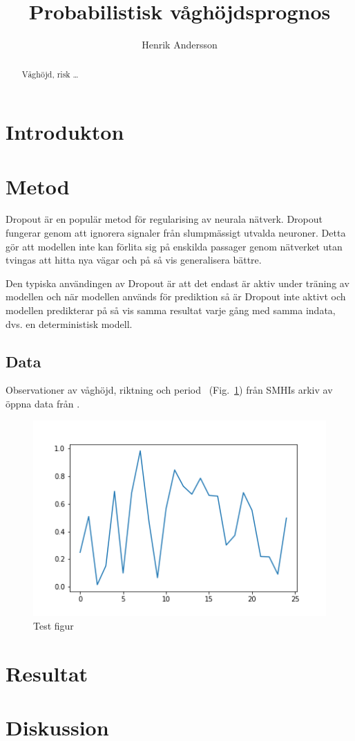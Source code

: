 \documentclass{article}
\author{Henrik Andersson}
\title{Probabilistisk våghöjdsprognos}
\begin{document}
\maketitle
    
\begin{abstract}
Våghöjd, risk \ldots
\end{abstract}

\section{Introdukton}

\citep{deo01}

\section{Metod}

Dropout är en populär metod för regularising av neurala nätverk. Dropout fungerar genom att ignorera signaler från slumpmässigt utvalda neuroner. Detta gör att modellen inte kan förlita sig på enskilda passager genom nätverket utan tvingas att hitta nya vägar och på så vis generalisera bättre.

Den typiska användingen av Dropout är att det endast är aktiv under träning av modellen och när modellen används för prediktion så är Dropout inte aktivt och modellen predikterar på så vis samma resultat varje gång med samma indata, dvs. en deterministisk modell.

\subsection{Data}

Observationer av våghöjd, riktning och period ~(Fig.~\ref{fig:data-test}) från SMHIs arkiv av öppna data från \citet{smhi}.

\begin{figure}
    \includegraphics{fig/test}
    \caption{Test figur}
    \label{fig:data-test}
\end{figure}

\section{Resultat}

\section{Diskussion}



\end{document}
